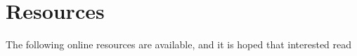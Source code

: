 \section{Resources}

The following online resources are available, and it is hoped that interested read